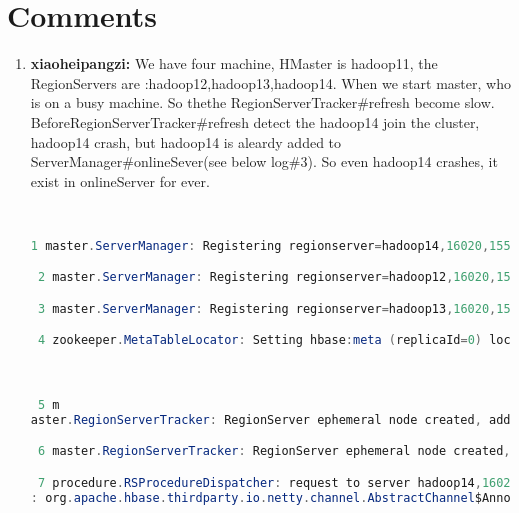 \documentclass{report}%
\begin{document}
\section{Comments}%
\label{sec:Comments}%
\begin{enumerate}%
\item%
\textbf{xiaoheipangzi: }We have four machine, HMaster is hadoop11, the RegionServers are :hadoop12,hadoop13,hadoop14.\newline%
\newline%
\newline%
\newline%
When we start master, who is on a busy machine. So thethe RegionServerTracker\#refresh become slow. BeforeRegionServerTracker\#refresh detect the hadoop14 join the cluster, hadoop14 crash, but hadoop14 is aleardy added to ServerManager\#onlineSever(see below log\#3). So even hadoop14 crashes, it exist in onlineServer for ever.\newline%
\newline%
\begin{lstlisting}[language=java]


1 master.ServerManager: Registering regionserver=hadoop14,16020,1552410583724

 2 master.ServerManager: Registering regionserver=hadoop12,16020,1552410578454

 3 master.ServerManager: Registering regionserver=hadoop13,16020,1552410566504

 4 zookeeper.MetaTableLocator: Setting hbase:meta (replicaId=0) location in ZooKeeper as hadoop14,16020,1552410583724



 5 m
aster.RegionServerTracker: RegionServer ephemeral node created, adding [hadoop12,16020,1552410578454]

 6 master.RegionServerTracker: RegionServer ephemeral node created, adding [hadoop13,16020,1552410566504]

 7 procedure.RSProcedureDispatcher: request to server hadoop14,16020,1552410583724 failed due to java.net.ConnectException: Call to hadoop14/172.16.1.131:16020 failed on connection exception
: org.apache.hbase.thirdparty.io.netty.channel.AbstractChannel$AnnotatedConnectException: syscall:getsockopt(..) failed: Connection refused: hadoop14/172.16.1.131:16020, try=0, retrying...




\end{lstlisting}
\end{enumerate}
\end{document}

